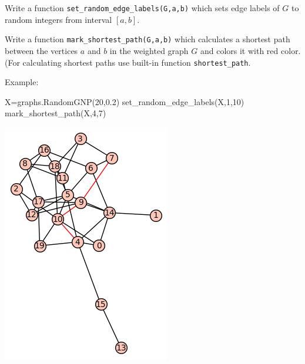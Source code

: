 \begin{exercise}
    Write a function \verb`set_random_edge_labels(G,a,b)` which sets edge labels of $G$ to random integers from interval $[a, b]$.

    Write a function \verb`mark_shortest_path(G,a,b)` which calculates a shortest path between the vertices $a$ and $b$ in the  weighted graph $G$ and colors it with red color. (For calculating shortest paths use built-in function \verb`shortest_path`.
\end{exercise}
Example:
\begin{sageCell}
    X=graphs.RandomGNP(20,0.2)
    set_random_edge_labels(X,1,10)
    mark_shortest_path(X,4,7)
\end{sageCell}
\begin{outImage}
    \includegraphics[width=0.4\linewidth]{Images/Introduction/output_shortest_path.png}
\end{outImage}




